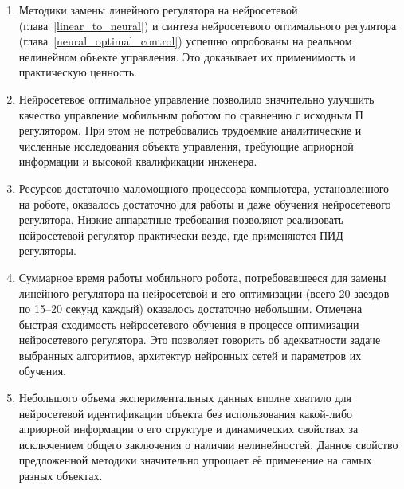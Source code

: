 \begin{enumerate}

\item Методики замены линейного регулятора на нейросетевой
(глава~\ref{linear_to_neural}) и синтеза нейросетевого оптимального
регулятора (глава~\ref{neural_optimal_control}) успешно опробованы на
реальном нелинейном объекте управления.  Это доказывает их
применимость и практическую ценность.

\item Нейросетевое оптимальное управление позволило значительно улучшить
качество управление мобильным роботом по сравнению с исходным
П регулятором.  При этом не потребовались трудоемкие аналитические и
численные исследования объекта управления, требующие априорной
информации и высокой квалификации инженера.

\item Ресурсов достаточно маломощного процессора компьютера,
установленного на роботе, оказалось достаточно для работы и даже
обучения нейросетевого регулятора.  Низкие аппаратные требования
позволяют реализовать нейросетевой регулятор практически везде, где
применяются ПИД регуляторы.

\item Суммарное время работы мобильного робота, потребовавшееся для
замены линейного регулятора на нейросетевой и его оптимизации (всего
20 заездов по 15--20 секунд каждый) оказалось достаточно небольшим.
Отмечена быстрая сходимость нейросетевого обучения в процессе
оптимизации нейросетевого регулятора.  Это позволяет говорить об
адекватности задаче выбранных алгоритмов, архитектур нейронных сетей и
параметров их обучения.

\item Небольшого объема экспериментальных данных вполне хватило для
нейросетевой идентификации объекта без использования какой-либо
априорной информации о его структуре и динамических свойствах за
исключением общего заключения о наличии нелинейностей.  Данное
свойство предложенной методики значительно упрощает её применение на
самых разных объектах.

\end{enumerate}

